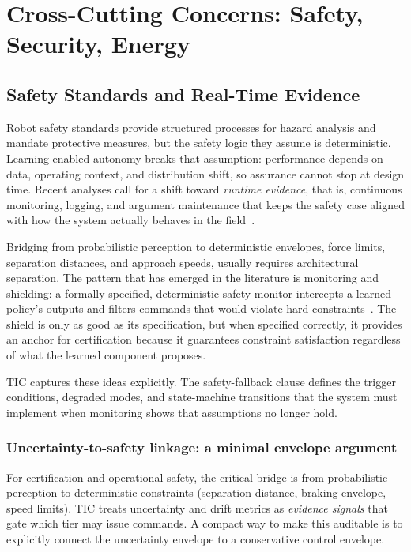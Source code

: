 \documentclass[smallextended]{svjour3}
\begin{document}
\section{Cross-Cutting Concerns: Safety, Security, Energy}
\label{sec:cross}


\subsection{Safety Standards and Real-Time Evidence}

Robot safety standards provide structured processes for hazard analysis and mandate protective measures, but the safety logic they assume is deterministic. Learning-enabled autonomy breaks that assumption: performance depends on data, operating context, and distribution shift, so assurance cannot stop at design time. Recent analyses call for a shift toward \emph{runtime evidence}, that is, continuous monitoring, logging, and argument maintenance that keeps the safety case aligned with how the system actually behaves in the field~\cite{safetystandards2023}.

Bridging from probabilistic perception to deterministic envelopes, force limits, separation distances, and approach speeds, usually requires architectural separation. The pattern that has emerged in the literature is monitoring and shielding: a formally
specified, deterministic safety monitor intercepts a learned policy's outputs and filters commands that would violate hard constraints~\cite{alshiekh2018}. The shield is only as good as its specification, but when specified correctly, it provides an anchor for certification because it guarantees constraint satisfaction regardless of what the learned component proposes.

TIC captures these ideas explicitly. The safety-fallback clause
defines the trigger conditions, degraded modes, and state-machine transitions that the system must implement when monitoring shows that assumptions no longer hold.

\subsubsection{Uncertainty-to-safety linkage: a minimal envelope argument}
\label{subsec:uncertainty_safety}
For certification and operational safety, the critical bridge is from probabilistic
perception to deterministic constraints (separation distance, braking envelope, speed
limits). TIC treats uncertainty and drift metrics as \emph{evidence signals} that gate
which tier may issue commands. A compact way to make this auditable is to explicitly
connect the uncertainty envelope to a conservative control envelope.
\end{document}
